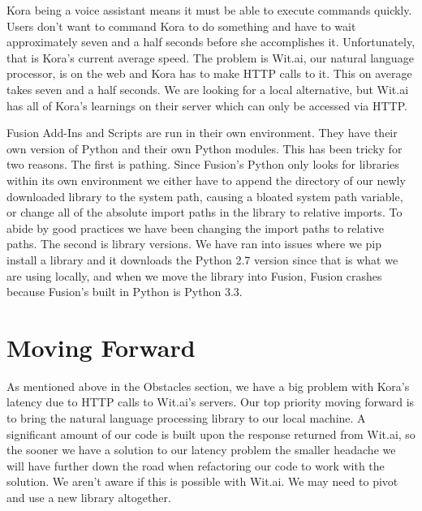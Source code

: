 \documentclass[onecolumn, draftclsnofoot,10pt, compsoc]{IEEEtran}
\begin{document}
		Kora being a voice assistant means it must be able to execute commands quickly.
		Users don't want to command Kora to do something and have to wait approximately seven and a half seconds before she accomplishes it.
		Unfortunately, that is Kora's current average speed.
		The problem is Wit.ai, our natural language processor, is on the web and Kora has to make HTTP calls to it.
		This on average takes seven and a half seconds.
		We are looking for a local alternative, but Wit.ai has all of Kora's learnings on their server which can only be accessed via HTTP.
		
		
		Fusion Add-Ins and Scripts are run in their own environment.
		They have their own version of Python and their own Python modules.
		This has been tricky for two reasons.
		The first is pathing.
		Since Fusion's Python only looks for libraries within its own environment we either have to append the directory of our newly downloaded library to the system path, causing a bloated system path variable, or change all of the absolute import paths in the library to relative imports.
		To abide by good practices we have been changing the import paths to relative paths.
		The second is library versions.
		We have ran into issues where we pip install a library and it downloads the Python 2.7 version since that is what we are using locally, and when we move the library into Fusion, Fusion crashes because Fusion's built in Python is Python 3.3.
		
		
		
\section{Moving Forward}

	

		As mentioned above in the Obstacles section, we have a big problem with Kora's latency due to HTTP calls to Wit.ai's servers.
		Our top priority moving forward is to bring the natural language processing library to our local machine.
		A significant amount of our code is built upon the response returned from Wit.ai, so the sooner we have a solution to our latency problem the smaller headache we will have further down the road when refactoring our code to work with the solution.
		We aren't aware if this is possible with Wit.ai.
		We may need to pivot and use a new library altogether.
		
\end{document}
